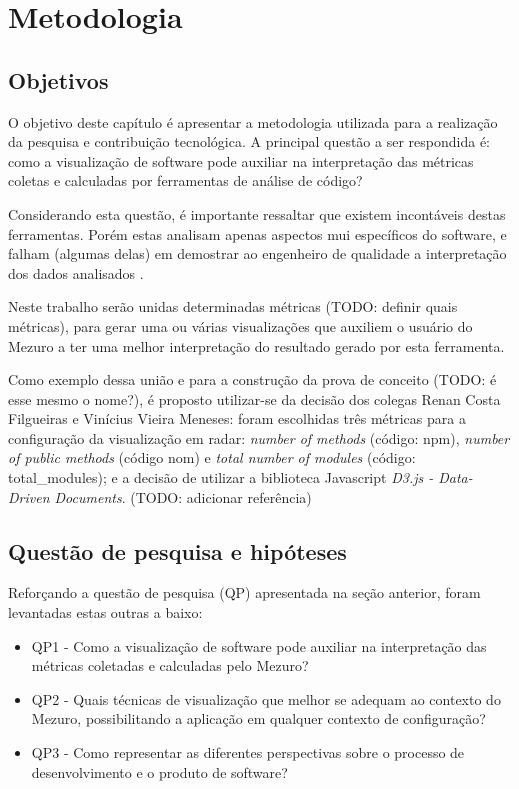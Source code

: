 \chapter{Metodologia}

\section{Objetivos}

O objetivo deste capítulo é apresentar a metodologia utilizada para a
realização da pesquisa e contribuição tecnológica. A principal questão
a ser respondida é: como a visualização de software pode auxiliar na
interpretação das métricas coletas e calculadas por ferramentas de análise
de código?

Considerando esta questão, é importante ressaltar que existem incontáveis
destas ferramentas. Porém estas analisam apenas aspectos mui específicos
do software, e falham (algumas delas) em demostrar ao engenheiro de
qualidade a interpretação dos dados analisados \cite{deissenboeck2011}.

Neste trabalho serão unidas determinadas métricas (TODO: definir quais
métricas), para gerar uma ou várias visualizações que auxiliem o usuário
do Mezuro a ter uma melhor interpretação do resultado gerado por esta
ferramenta.

Como exemplo dessa união e para a construção da prova de conceito
(TODO: é esse mesmo o nome?), é proposto utilizar-se da decisão dos
colegas Renan Costa Filgueiras e Vinícius Vieira Meneses: foram escolhidas
três métricas para a configuração da visualização em radar: \textit{number
of methods} (código: npm), \textit{number of public methods} (código nom)
e \textit{total number of modules} (código: total\_modules); e a decisão
de utilizar a biblioteca Javascript \textit{D3.js - Data-Driven Documents}.
(TODO: adicionar referência)


\section{Questão de pesquisa e hipóteses}

Reforçando a questão de pesquisa (QP) apresentada na seção anterior,
foram levantadas estas outras a baixo:

\begin{itemize}
  \item QP1 - Como a visualização de software pode auxiliar na
  interpretação das métricas coletadas e calculadas pelo Mezuro?
  \item QP2 - Quais técnicas de visualização que melhor se adequam ao
  contexto do Mezuro, possibilitando a aplicação em qualquer contexto de
  configuração?
  \item QP3 - Como representar as diferentes perspectivas sobre o processo
  de desenvolvimento e o produto de software?
\end{itemize}

